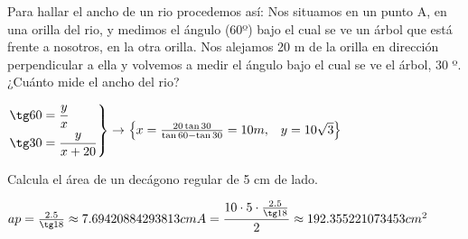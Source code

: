 \documentclass[addpoints,spanish, 12pt,a4paper]{exam}
\begin{document}
\begin{questions}
\begin{multicols}{2}
\begin{parts}
\end{parts}
\end{multicols}

\question[2] Para  hallar  el  ancho  de  un  rio  procedemos  así:  Nos  situamos  en  un  punto  A,  en  una  orilla 
del  rio,  y 
medimos  el  ángulo  (60º)  bajo
el  cual  se  ve  un  árbol  que  está  frente  a  nosotros,  en  la  otra  orilla.  Nos 
alejamos 20 m de la orilla en dirección perpendicular a ella y volvemos a medir el ángulo
bajo el cual se ve 
el árbol, 30
º. ¿Cuánto mide el ancho del rio? 
 
\begin{solution}$ \left. \begin{gathered}
	  \tg 60 = \frac{y}{x} \hfill \\
	  \tg 30 = \frac{y}{x+20} \hfill \\ 
	\end{gathered}  \right\} \to \begin{Bmatrix}x=\frac{20\tan30}{\tan60 - \tan30} =10 m, & y= 10 \sqrt{3}\end{Bmatrix}$
\end{solution}	  


\addpoints


\question[2] Calcula el área de un decágono regular de 5 cm de lado.
\begin{solution}$ ap = \frac{2.5}{\tg18}\approx7.69420884293813 cm \\ A=\dfrac{10\cdot5\cdot\frac{2.5}{\tg18}}{2}\approx192.355221073453 cm^2 $ \end{solution}


\end{questions}
\end{document}
